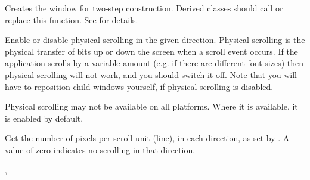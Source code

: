 Creates the window for two-step construction. Derived classes
should call or replace this function. See \rtfsp
for details.

\label{wxscrolledwindowenablescrolling}


Enable or disable physical scrolling in the given direction. Physical
scrolling is the physical transfer of bits up or down the
screen when a scroll event occurs. If the application scrolls by a
variable amount (e.g. if there are different font sizes) then physical
scrolling will not work, and you should switch it off. Note that you
will have to reposition child windows yourself, if physical scrolling
is disabled.





Physical scrolling may not be available on all platforms. Where it is available, it is enabled
by default.

\label{wxscrolledwindowgetscrollpixelsperunit}


Get the number of pixels per scroll unit (line), in each direction, as set
by . A value of zero indicates no
scrolling in that direction.





,\rtfsp
{}


